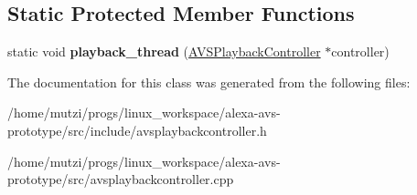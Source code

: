\subsection*{Static Protected Member Functions}
\begin{DoxyCompactItemize}
\item 
\mbox{\label{classAVSPlaybackController_a4faf15973cba9a358ecf4ecf70cac983}} 
static void {\bfseries playback\+\_\+thread} (\hyperlink{classAVSPlaybackController}{A\+V\+S\+Playback\+Controller} $\ast$controller)
\end{DoxyCompactItemize}


The documentation for this class was generated from the following files\+:\begin{DoxyCompactItemize}
\item 
/home/mutzi/progs/linux\+\_\+workspace/alexa-\/avs-\/prototype/src/include/avsplaybackcontroller.\+h\item 
/home/mutzi/progs/linux\+\_\+workspace/alexa-\/avs-\/prototype/src/avsplaybackcontroller.\+cpp\end{DoxyCompactItemize}
